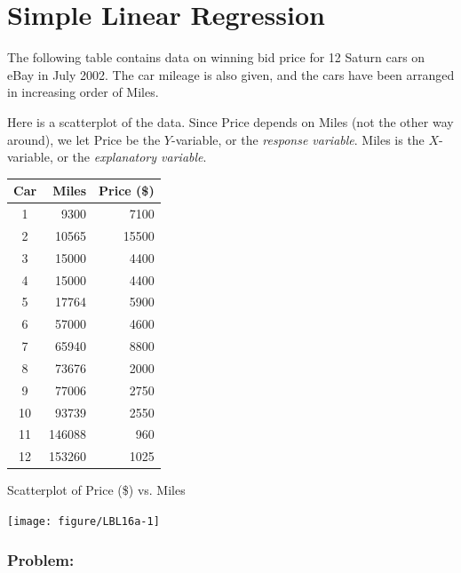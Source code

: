 \documentclass[11pt, chapterprefix=true]{scrbook}\usepackage[]{graphicx}\usepackage[]{color}
\begin{document}
\section{Simple Linear Regression}  

The following table contains data on winning bid price for 12 Saturn cars on eBay in July 2002.  The car mileage is also given, and the cars have been arranged in increasing order of Miles.

Here is a scatterplot of the data.  Since Price depends on Miles (not the other way around), we let Price be the $Y$-variable, or the \textit{response variable}.    Miles is the $X$-variable, or the \textit{explanatory variable}.

\begin{minipage}[ht]{7cm}
\centering 
\begin{tabular}{@{} c rr @{}} \hline 
Car & Miles & Price (\$) \\ \hline
1 & 9300 & 7100 \\
2 & 10565 & 15500 \\
3 & 15000 & 4400 \\
4 & 15000 & 4400 \\
5 & 17764 & 5900 \\
6 & 57000 & 4600 \\
7 & 65940 & 8800 \\
8 & 73676 & 2000 \\
9 & 77006 & 2750 \\
10 & 93739 & 2550 \\
11 & 146088 & 960 \\
12 & 153260 & 1025 \\ \hline
\end{tabular}
\end{minipage}
\begin{minipage}[ht]{7cm}
\centering
Scatterplot of Price (\$) vs. Miles



{\centering \texttt{[image: figure/LBL16a-1]} 

}



\end{minipage}

\subsubsection{Problem:}
\end{document}
